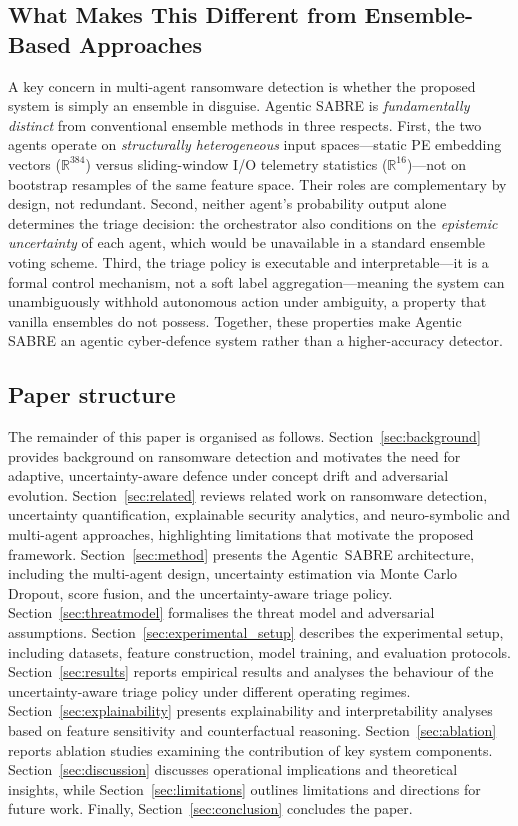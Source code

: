 \documentclass[3p]{elsarticle}
\begin{document}
\begin{changedblock}
\subsection*{What Makes This Different from Ensemble-Based Approaches}

A key concern in multi-agent ransomware detection is whether the proposed system is simply
an ensemble in disguise. Agentic SABRE is \emph{fundamentally distinct} from conventional
ensemble methods in three respects. First, the two agents operate on \emph{structurally
heterogeneous} input spaces---static PE embedding vectors ($\mathbb{R}^{384}$) versus
sliding-window I/O telemetry statistics ($\mathbb{R}^{16}$)---not on bootstrap resamples
of the same feature space. Their roles are complementary by design, not redundant. Second,
neither agent's probability output alone determines the triage decision: the orchestrator
also conditions on the \emph{epistemic uncertainty} of each agent, which would be unavailable
in a standard ensemble voting scheme. Third, the triage policy is executable and
interpretable---it is a formal control mechanism, not a soft label aggregation---meaning
the system can unambiguously withhold autonomous action under ambiguity, a property that
vanilla ensembles do not possess. Together, these properties make Agentic SABRE an agentic
cyber-defence system rather than a higher-accuracy detector.
\end{changedblock}

\subsection*{Paper structure}
The remainder of this paper is organised as follows.
Section~\ref{sec:background} provides background on ransomware detection and
motivates the need for adaptive, uncertainty-aware defence under concept drift
and adversarial evolution. Section~\ref{sec:related} reviews related work on
ransomware detection, uncertainty quantification, explainable security analytics,
and neuro-symbolic and multi-agent approaches, highlighting limitations that
motivate the proposed framework. Section~\ref{sec:method} presents the Agentic~SABRE
architecture, including the multi-agent design, uncertainty estimation via Monte
Carlo Dropout, score fusion, and the uncertainty-aware triage policy.
Section~\ref{sec:threatmodel} formalises the threat model and adversarial
assumptions. Section~\ref{sec:experimental_setup} describes the experimental
setup, including datasets, feature construction, model training, and evaluation
protocols. Section~\ref{sec:results} reports empirical results and analyses the
behaviour of the uncertainty-aware triage policy under different operating
regimes. Section~\ref{sec:explainability} presents explainability and
interpretability analyses based on feature sensitivity and counterfactual
reasoning. Section~\ref{sec:ablation} reports ablation studies examining the
contribution of key system components. Section~\ref{sec:discussion} discusses
operational implications and theoretical insights, while
Section~\ref{sec:limitations} outlines limitations and directions for future
work. Finally, Section~\ref{sec:conclusion} concludes the paper.
\end{document}
